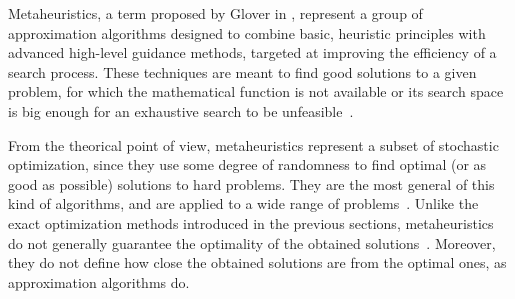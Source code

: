 Metaheuristics, a term proposed by Glover in \cite{Glover-Future_paths_for_integer_programming_and_links_to_artificial_intelligence:1986},
represent a group of approximation algorithms designed to combine
basic, heuristic principles with advanced high-level guidance methods,
targeted at improving the efficiency of a search process. These techniques
are meant to find good solutions to a given problem, for which the
mathematical function is not available or its search space is big
enough for an exhaustive search to be unfeasible~\cite{Kochenberger_Handbook_of_metaheuristics:2003}.

From the theorical point of view, metaheuristics represent a subset
of stochastic optimization, since they use some degree of randomness
to find optimal (or as good as possible) solutions to hard problems.
They are the most general of this kind of algorithms, and are applied
to a wide range of problems~\cite{Luke-Essentials_of_metaheuristics:2009}.
Unlike the exact optimization methods introduced in the previous sections,
metaheuristics do not generally guarantee the optimality of the obtained
solutions~\cite{Talbi_Metaheuristics:2009}. Moreover, they do not
define how close the obtained solutions are from the optimal ones,
as approximation algorithms do.


